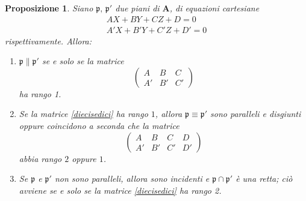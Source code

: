 \documentclass{article}
\theoremstyle{plain}
\newtheorem{prop}[thm]{Proposizione}
\theoremstyle{definition}
\theoremstyle{remark}
\begin{document}
\vspace{10pt}

\begin{bxthm}
\begin{prop}
 Siano $\mathfrak{p},\,\mathfrak{p}'$ due piani di $\mathbf{A}$, di equazioni cartesiane
\begin{equation}\label{dieciquindici}
    \begin{matrix}
        AX + BY + CZ + D = 0 \\
        A'X + B'Y + C'Z + D' = 0     
    \end{matrix}
\end{equation}
rispettivamente. Allora:
\begin{enumerate}
    \item $\mathfrak{p}\parallel\mathfrak{p}'$ se e solo se la matrice
    \begin{equation}\label{diecisedici}
    \begin{pmatrix}
    A & B & C \\
    A' & B' & C'
    \end{pmatrix}
    \end{equation} ha rango 1.
    \item Se la matrice \ref{diecisedici} ha rango $1$, allora $\mathfrak{p} \equiv \mathfrak{p}'$ sono paralleli e disgiunti oppure coincidono a seconda che la matrice
    \begin{equation}\label{diecidiciassette}
    \begin{pmatrix}
    A & B & C & D \\
    A' & B' & C' & D'
    \end{pmatrix}    
    \end{equation}
    abbia rango $2$ oppure $1$.
\item Se $\mathfrak{p}$ e $\mathfrak{p}'$ non sono paralleli, allora sono incidenti e $\mathfrak{p} \cap \mathfrak{p}'$ è una retta; ciò avviene se e solo se la matrice \ref{diecisedici} ha rango 2.
\end{enumerate}   
\end{prop}
\end{bxthm}
\end{document}
